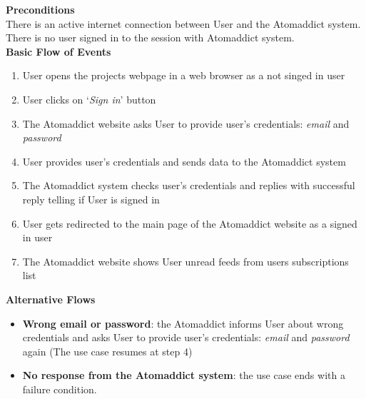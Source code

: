 \documentclass[12pt]{article}
\begin{document}
\vspace{0.5cm}


\textbf{Preconditions}\\
There is an active internet connection between User and the Atomaddict system. There is no user signed in to the session with Atomaddict system.\\


\textbf{Basic Flow of Events}

\begin{enumerate}

    \item User opens the projects webpage in a web browser as a not singed in user

    \item User clicks on `\emph{Sign in}' button 

    \item The Atomaddict website asks User to provide user's credentials: \emph{email} and \emph{password}

    \item User provides user's credentials and sends data to the Atomaddict system

    \item The Atomaddict system checks user's credentials and replies with successful reply telling if User is signed in

    \item User gets redirected to the main page of the Atomaddict website as a signed in user

    \item The Atomaddict website shows User unread feeds from users subscriptions list

\end{enumerate}

\vspace{0.5cm}


\textbf{Alternative Flows}

\begin{itemize}

    \item \textbf{Wrong email or password}: the Atomaddict informs User about wrong credentials and asks User to provide user's credentials: \emph{email} and \emph{password} again (The use case resumes at step 4)

    \item \textbf{No response from the Atomaddict system}: the use case ends with a failure condition.

\end{itemize}
\end{document}
